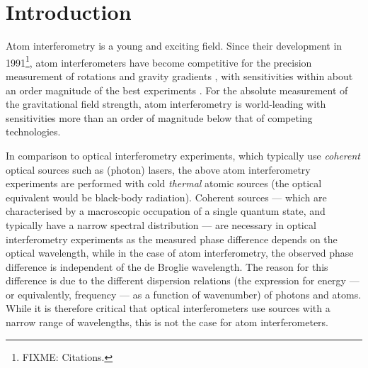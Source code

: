 \chapter{Introduction}
\label{Introduction}
\graphicspath{{Figures/Introduction/}{Figures/Common/}}


Atom interferometry is a young and exciting field.  Since their development in 1991\footnote{FIXME: Citations.}, atom interferometers have become competitive for the precision measurement of rotations \citep{McGuirk:2002} and gravity gradients \citep{Gustavson:2000}, with sensitivities within about an order magnitude of the best experiments \citep{Schreiber:2008,Moody:1993,Kann:1994}.  For the absolute measurement of the gravitational field strength, atom interferometry is world-leading \citep{Muller:2008} with sensitivities more than an order of magnitude below that of competing technologies.

In comparison to optical interferometry experiments, which typically use \emph{coherent} optical sources such as (photon) lasers, the above atom interferometry experiments are performed with cold \emph{thermal} atomic sources (the optical equivalent would be black-body radiation).  Coherent sources --- which are characterised by a macroscopic occupation of a single quantum state, and typically have a narrow spectral distribution --- are necessary in optical interferometry experiments as the measured phase difference depends on the optical wavelength, while in the case of atom interferometry, the observed phase difference is independent of the de Broglie wavelength.  The reason for this difference is due to the different dispersion relations (the expression for energy --- or equivalently, frequency --- as a function of wavenumber) of photons and atoms.  While it is therefore critical that optical interferometers use sources with a narrow range of wavelengths, this is not the case for atom interferometers.

